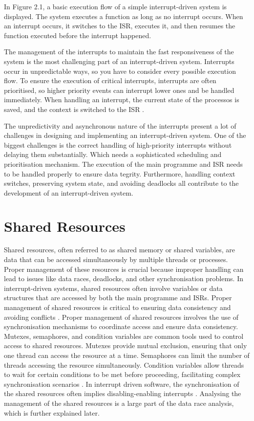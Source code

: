 \documentclass[
fancyheadings, %
%
%
]{stsreprt}
\begin{document}
{In Figure 2.1, a basic execution flow of a simple interrupt-driven system is displayed. The system executes a function as long as no interrupt occurs. When an interrupt occurs, it switches to the ISR, executes it, and then resumes the function executed before the interrupt happened.

The management of the interrupts to maintain the fast responsiveness of the system is the most challenging part of an interrupt-driven system. Interrupts occur in unpredictable ways, so you have to consider every possible execution flow. To ensure the execution of critical interrupts, interrupts are often prioritised, so higher priority events can interrupt lower ones and be handled immediately. When handling an interrupt, the current state of the processos is saved, and the context is switched to the ISR \cite{wang2020}.

The unpredictivity and asynchronous nature of the interrupts present a lot of challenges in designing and implementing an interrupt-driven system. One of the biggest challenges is the correct handling of high-priority interrupts without delaying them substantially. Which needs a sophisticated scheduling and prioritisation mechanism. The execution of the main programme and ISR needs to be handled properly to ensure data tegrity. Furthermore, handling context switches, preserving system state, and avoiding deadlocks all contribute to the development of an interrupt-driven system.

\section{Shared Resources}
Shared resources, often referred to as shared memory or shared variables, are data that can be accessed simultaneously by multiple threads or processes. Proper management of these resources is crucial because improper handling can lead to issues like data races, deadlocks, and other synchronisation problems. In interrupt-driven systems, shared resources often involve variables or data structures that are accessed by both the main programme and ISRs. Proper management of shared resources is critical to ensuring data consistency and avoiding conflicts \cite{herlihy2008}.
Proper management of shared resources involves the use of synchronisation mechanisms to coordinate access and ensure data consistency. Mutexes, semaphores, and condition variables are common tools used to control access to shared resources. Mutexes provide mutual exclusion, ensuring that only one thread can access the resource at a time. Semaphores can limit the number of threads accessing the resource simultaneously. Condition variables allow threads to wait for certain conditions to be met before proceeding, facilitating complex synchronisation scenarios \cite{herlihy2008}. In interrupt driven software, the synchronisation of the shared resources often implies disabling-enabling interrupts \cite{chopra2019}. Analysing the management of the shared resources is a large part of the data race analysis, which is further explained later.
}
\end{document}
